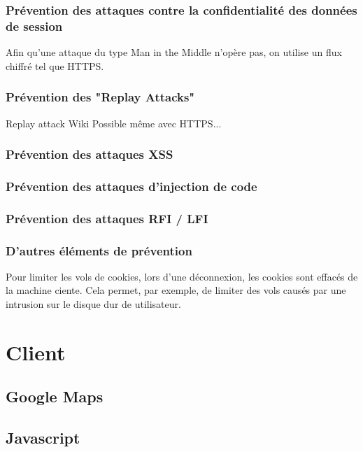 \documentclass[a4paper]{article}
\begin{document}
		\subsubsection{Prévention des attaques contre la confidentialité des données de session}
		
Afin qu'une attaque du type Man in the Middle n'opère pas, on utilise un flux chiffré tel que HTTPS.

		\subsubsection{Prévention des "Replay Attacks"}

		Replay attack Wiki
		Possible même avec HTTPS...
 		
 		\subsubsection{Prévention des attaques XSS}
 		
 		
 		
		\subsubsection{Prévention des attaques d'injection de code}
		\subsubsection{Prévention des attaques RFI / LFI}
		
		\subsubsection{D'autres éléments de prévention}
		
Pour limiter les vols de cookies, lors d'une déconnexion, les cookies sont effacés de la machine ciente.
Cela permet, par exemple, de limiter des vols causés par une intrusion sur le disque dur de utilisateur.
 		
\section{Client}

	\subsection{Google Maps}
	\subsection{Javascript} 
\end{document}
